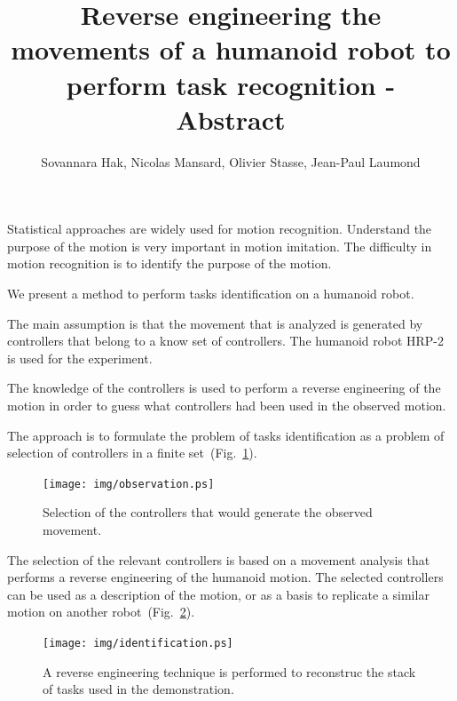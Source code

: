 \documentclass[letterpaper, 10pt, conference]{ieeeconf}      %
\author {Sovannara Hak, Nicolas Mansard, Olivier Stasse, Jean-Paul Laumond}
\title{Reverse engineering the movements of a humanoid robot to perform task recognition - Abstract}
\begin{document}
\maketitle

Statistical approaches are widely used for motion recognition.
Understand the purpose of the motion is very important in motion imitation.
The difficulty in motion recognition is to identify the purpose of the motion.


We present a method to perform tasks identification on a
humanoid robot. 

The main assumption is that the movement that is analyzed is generated by
controllers that belong to a know set of controllers. The humanoid robot
HRP-2 is used for the experiment.

The knowledge of the controllers is used to perform a reverse engineering
of the motion in order to guess what controllers had been used in 
the observed motion.

The approach is to formulate
the problem of tasks identification as a problem of
selection of controllers in a finite set~(Fig.~\ref{fig:observation}). 
\begin{figure}[t]
\begin{center}
\texttt{[image: img/observation.ps]}
\end{center}
\caption{Selection of the controllers that would generate the observed movement.}
\label{fig:observation}
\end{figure}
The selection of the relevant controllers is based on a movement analysis
that performs a reverse engineering of the humanoid motion.
The selected controllers can be used as a description of the motion, or as
a basis to replicate a similar motion on another robot~(Fig.~\ref{fig:identification}).
\begin{figure}[t]
\begin{center}
\texttt{[image: img/identification.ps]}
\end{center}
\caption{A reverse engineering technique is performed to reconstruc the stack of tasks
used in the demonstration.}
\label{fig:identification}
\end{figure}
\end{document}
